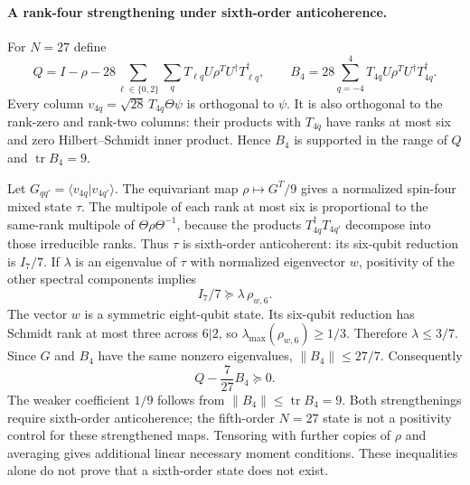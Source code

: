 \documentclass{article}
\begin{document}
\paragraph{A rank-four strengthening under sixth-order anticoherence.}
For $N=27$ define
\[
 Q=I-\rho-28\sum_{\ell\in\{0,2\}}\sum_q
                  T_{\ell q}U\rho^TU^\dagger T_{\ell q}^\dagger,
 \qquad
 B_4=28\sum_{q=-4}^4 T_{4q}U\rho^TU^\dagger T_{4q}^\dagger.
\]
Every column $v_{4q}=\sqrt{28}\,T_{4q}\Theta\psi$ is orthogonal to $\psi$.
It is also orthogonal to the rank-zero and rank-two columns: their
products with $T_{4q}$ have ranks at most six and zero Hilbert--Schmidt
inner product. Hence $B_4$ is supported in the range of $Q$ and
$\operatorname{tr}B_4=9$.

Let $G_{qq'}=\langle v_{4q}|v_{4q'}\rangle$. The equivariant map
$\rho\mapsto G^T/9$ gives a normalized spin-four mixed state $\tau$.
The multipole of each rank at most six is proportional to the same-rank
multipole of $\Theta\rho\Theta^{-1}$, because the products
$T_{4q}^\dagger T_{4q'}$ decompose into those irreducible ranks.
Thus $\tau$ is sixth-order anticoherent:
its six-qubit reduction is $I_7/7$.
If $\lambda$ is an eigenvalue of $\tau$ with normalized eigenvector $w$,
positivity of the other spectral components implies
\[
 I_7/7\succeq\lambda\,\rho_{w,6}.
\]
The vector $w$ is a symmetric eight-qubit state. Its six-qubit reduction
has Schmidt rank at most three across $6|2$, so
$\lambda_{\max}(\rho_{w,6})\ge1/3$. Therefore $\lambda\le3/7$.
Since $G$ and $B_4$ have the same nonzero eigenvalues,
$\|B_4\|\le27/7$. Consequently
\[
 \boxed{\quad Q-\frac7{27}B_4\succeq0.\quad}
\]
The weaker coefficient $1/9$ follows from $\|B_4\|\le\operatorname{tr}B_4=9$.
Both strengthenings require sixth-order anticoherence; the fifth-order
$N=27$ state is not a positivity control for these strengthened maps.
Tensoring with further copies of $\rho$ and averaging gives additional
linear necessary moment conditions. These inequalities alone do not
prove that a sixth-order state does not exist.
\end{document}
